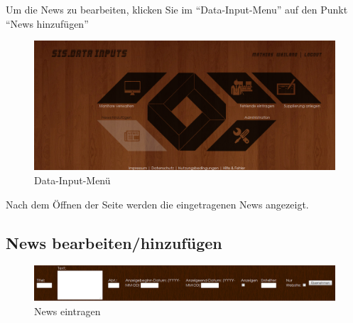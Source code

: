 Um die News zu bearbeiten, klicken Sie im \enquote{Data-Input-Menu} auf den Punkt \enquote{News hinzufügen}
\\
\begin{figure}[H]
\centering
\includegraphics[keepaspectratio=true, width=16cm]{images/screenshots/data-inputs_news.png}
\caption{Data-Input-Menü}
\label{fig:instr_admin_data_inputs_news}
\end{figure}


Nach dem Öffnen der Seite werden die eingetragenen News angezeigt.
\\

\subsection{News bearbeiten/hinzufügen}

\begin{figure}[H]
\centering
\includegraphics[keepaspectratio=true, width=16cm]{images/screenshots/news_insert.png}
\caption{News eintragen}
\label{fig:instr_admin_news_insert}
\end{figure}


